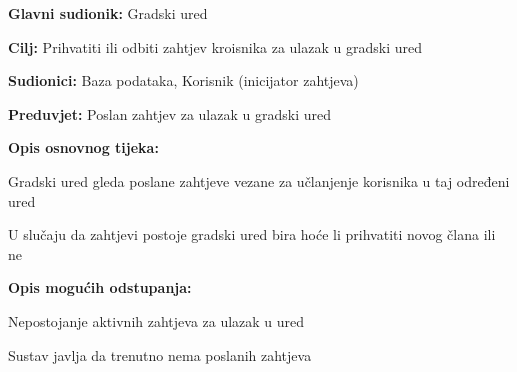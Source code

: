 					\noindent {}
					\begin{packed_item}
	
						\item \textbf{Glavni sudionik: }Gradski ured
						\item  \textbf{Cilj:} Prihvatiti ili odbiti zahtjev kroisnika za ulazak u  gradski ured
						\item  \textbf{Sudionici:} Baza podataka, Korisnik (inicijator zahtjeva)
						\item  \textbf{Preduvjet:} Poslan zahtjev za ulazak u gradski ured
						\item  \textbf{Opis osnovnog tijeka:}
						
						\item[] \begin{packed_enum}
	
							\item Gradski ured gleda poslane zahtjeve vezane za učlanjenje korisnika u taj određeni ured
							\item U slučaju da zahtjevi postoje gradski ured bira hoće li prihvatiti novog člana ili ne

						\end{packed_enum}
						
						\item  \textbf{Opis mogućih odstupanja:}
						
						\item[] \begin{packed_item}
	
							\item[1.a] Nepostojanje aktivnih zahtjeva za ulazak u ured
							\item[] \begin{packed_enum}
								
								\item Sustav javlja da trenutno nema poslanih zahtjeva	
							\end{packed_enum}
						\end{packed_item}
						
					\end{packed_item}
					
